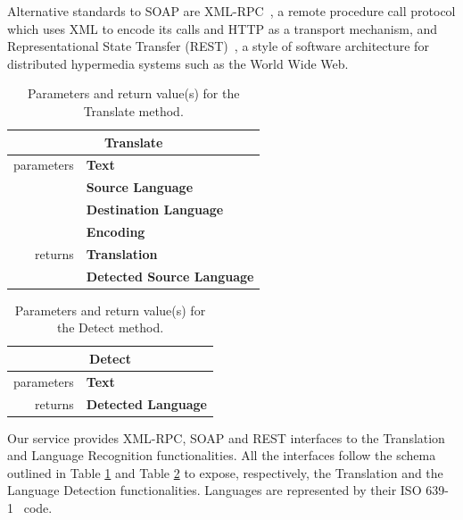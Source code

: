 \documentclass[11pt]{article}
\begin{document}
Alternative standards to SOAP are XML-RPC~\citep{xmlrpcspec}, a remote procedure call protocol which uses XML to encode its calls and HTTP as a transport mechanism, and Representational State Transfer (REST)~\citep{rest}, a style of software architecture for distributed hypermedia systems such as the World Wide Web.

\begin{table}[!ht]
\begin{center}
 \begin{tabular}{|r|l|}
  \hline
  \multicolumn{2}{c}{{\bf Translate}} \\
  \hline \hline
   parameters	& {\bf Text} \\ \cline{2-2}
   				& {\bf Source Language} \\ \cline{2-2}
   				& {\bf Destination Language} \\ \cline{2-2}
   				& {\bf Encoding } \\
  \hline \hline
   returns 	& {\bf Translation} \\ \cline{2-2}
   			& {\bf Detected Source Language} \\
  \hline
 \end{tabular}
\end{center}
\caption{Parameters and return value(s) for the Translate method.}

\label{tab:translate}
\end{table}

\begin{table}[!ht]
\begin{center}
 \begin{tabular}{|r|l|}
  \hline
  \multicolumn{2}{c}{{\bf Detect}} \\
  \hline \hline
   parameters	& {\bf Text} \\
  \hline \hline
   returns 	& {\bf Detected Language}\\
  \hline
 \end{tabular}
\end{center}
\caption{Parameters and return value(s) for the Detect method.}
\label{tab:detect}
\end{table}

Our service provides XML-RPC, SOAP and REST interfaces to the Translation and Language Recognition functionalities. All the interfaces follow the schema outlined in Table \ref{tab:translate} and Table \ref{tab:detect} to expose, respectively, the Translation and the Language Detection functionalities. Languages are represented by their ISO 639-1~\citep{ISO:639-1} code.
\end{document}
